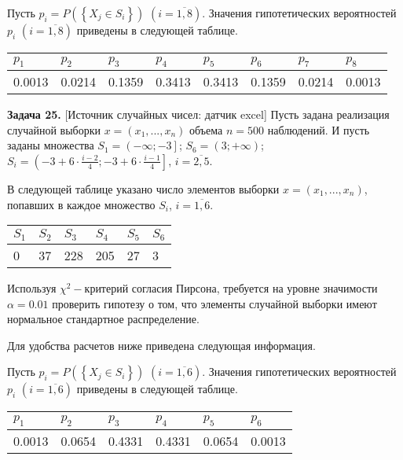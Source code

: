Пусть $p_{i} =P\left(\left\{X_{j} \in S_{i} \right\}\right)$ $\left(i=\overline{1,8}\right)$. Значения гипотетических вероятностей $p_{i} $ $\left(i=\overline{1,8}\right)$ приведены в следующей таблице.

\begin{tabular}{|p{0.4in}|p{0.4in}|p{0.4in}|p{0.4in}|p{0.4in}|p{0.4in}|p{0.4in}|p{0.4in}|} \hline 
$p_{1} $ & $p_{2} $ & $p_{3} $ & $p_{4} $ & $p_{5} $ & $p_{6} $ & $p_{7} $ & $p_{8} $ \\ \hline 
0.0013 & 0.0214 & 0.1359 & 0.3413 & 0.3413 & 0.1359 & 0.0214 & 0.0013 \\ \hline 
\end{tabular}



\textbf{Задача 25.} [Источник случайных чисел: датчик excel] Пусть задана реализация случайной выборки $x=\left(x_{1} ,...,x_{n} \right)$ объема $n=500$ наблюдений. И пусть заданы множества $S_{1} =\left(-\infty ;-3\right]$; $S_{6} =\left(3;+\infty \right)$;$S_{i} =\left(-3+6\cdot {\tfrac{i-2}{4}} ;-3+6\cdot {\tfrac{i-1}{4}} \right]$, $i=\overline{2,5}$. 

В следующей таблице указано число элементов выборки $x=\left(x_{1} ,...,x_{n} \right)$, попавших в каждое множество $S_{i} $, $i=\overline{1,6}$.

\begin{tabular}{|p{0.3in}|p{0.3in}|p{0.3in}|p{0.3in}|p{0.3in}|p{0.3in}|} \hline 
$S_{1} $ & $S_{2} $ & $S_{3} $ & $S_{4} $ & $S_{5} $ & $S_{6} $ \\ \hline 
0 & 37 & 228 & 205 & 27 & 3 \\ \hline 
\end{tabular}



Используя $\chi ^{2} -$критерий согласия Пирсона, требуется на уровне значимости $\alpha =0.01$ проверить гипотезу о том, что элементы случайной выборки имеют нормальное стандартное распределение.

Для удобства расчетов ниже приведена следующая информация.

Пусть $p_{i} =P\left(\left\{X_{j} \in S_{i} \right\}\right)$ $\left(i=\overline{1,6}\right)$. Значения гипотетических вероятностей $p_{i} $ $\left(i=\overline{1,6}\right)$ приведены в следующей таблице.

\begin{tabular}{|p{0.4in}|p{0.4in}|p{0.4in}|p{0.4in}|p{0.4in}|p{0.4in}|} \hline 
$p_{1} $ & $p_{2} $ & $p_{3} $ & $p_{4} $ & $p_{5} $ & $p_{6} $ \\ \hline 
0.0013 & 0.0654 & 0.4331 & 0.4331 & 0.0654 & 0.0013 \\ \hline 
\end{tabular}

